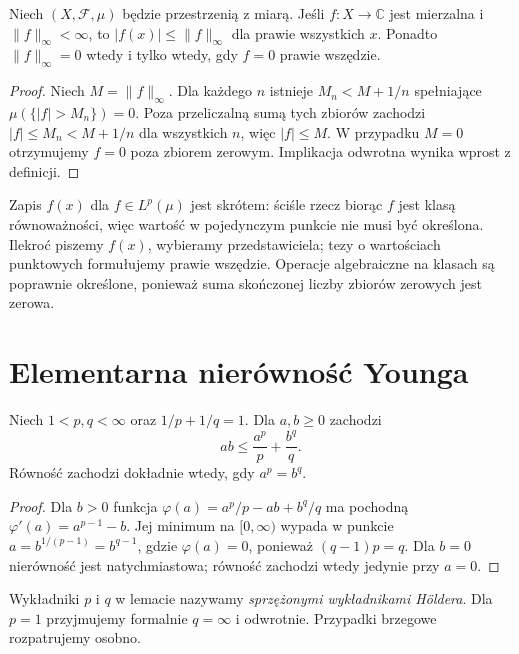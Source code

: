 \begin{lemat}
\label{lem:esssup-14}
Niech $(X,\mathcal F,\mu)$ będzie przestrzenią z miarą.
Jeśli $f:X\to\mathbb C$ jest mierzalna
i $\|f\|_\infty<\infty$,
to $|f(x)|\le\|f\|_\infty$ dla prawie wszystkich $x$.
Ponadto $\|f\|_\infty=0$ wtedy i tylko wtedy, gdy
$f=0$ prawie wszędzie.
\end{lemat}
\begin{proof}
Niech $M=\|f\|_\infty$. Dla każdego $n$ istnieje
$M_n<M+1/n$ spełniające $\mu(\{|f|>M_n\})=0$.
Poza przeliczalną sumą tych zbiorów zachodzi
$|f|\le M_n<M+1/n$ dla wszystkich $n$, więc $|f|\le M$.
W przypadku $M=0$ otrzymujemy $f=0$ poza zbiorem zerowym.
Implikacja odwrotna wynika wprost z definicji.
\end{proof}

\begin{uwaga}
Zapis $f(x)$ dla $f\in L^p(\mu)$ jest skrótem:
ściśle rzecz biorąc $f$ jest klasą równoważności, więc
wartość w pojedynczym punkcie nie musi być określona.
Ilekroć piszemy $f(x)$, wybieramy przedstawiciela;
tezy o wartościach punktowych formułujemy prawie wszędzie.
Operacje algebraiczne na klasach są poprawnie określone,
ponieważ suma skończonej liczby zbiorów zerowych jest zerowa.
\end{uwaga}

\section{Elementarna nierówność Younga}

\begin{lemat}
\label{lem:young-numbers-14}
Niech $1<p,q<\infty$ oraz $1/p+1/q=1$.
Dla $a,b\ge0$ zachodzi
\begin{equation}\label{eq:young-14}
ab\le\frac{a^p}{p}+\frac{b^q}{q}.
\end{equation}
Równość zachodzi dokładnie wtedy, gdy $a^p=b^q$.
\end{lemat}
\begin{proof}
Dla $b>0$ funkcja $\varphi(a)=a^p/p-ab+b^q/q$
ma pochodną $\varphi'(a)=a^{p-1}-b$.
Jej minimum na $[0,\infty)$ wypada w punkcie
$a=b^{1/(p-1)}=b^{q-1}$, gdzie
$\varphi(a)=0$, ponieważ $(q-1)p=q$.
Dla $b=0$ nierówność jest natychmiastowa;
równość zachodzi wtedy jedynie przy $a=0$.
\end{proof}

\begin{uwaga}
Wykładniki $p$ i $q$ w lemacie nazywamy
\emph{sprzężonymi wykładnikami Höldera}.
Dla $p=1$ przyjmujemy formalnie $q=\infty$ i odwrotnie.
Przypadki brzegowe rozpatrujemy osobno.
\end{uwaga}

